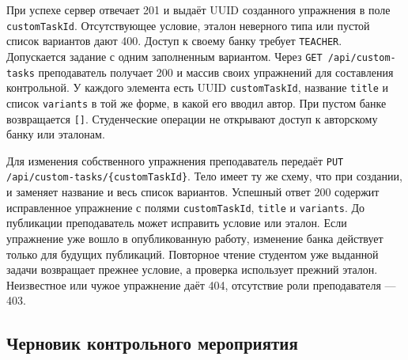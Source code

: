 \documentclass[12pt,a4paper]{article}
\begin{document}
При успехе сервер отвечает 201 и выдаёт UUID созданного упражнения в поле \texttt{custom\allowbreak{}Task\allowbreak{}Id}. Отсутствующее условие, эталон неверного типа или пустой список вариантов дают 400. Доступ к своему банку требует \texttt{TEACHER}. Допускается задание с одним заполненным вариантом. Через \texttt{GET /\allowbreak{}api/\allowbreak{}custom-\allowbreak{}tasks} преподаватель получает 200 и массив своих упражнений для составления контрольной. У каждого элемента есть UUID \texttt{custom\allowbreak{}Task\allowbreak{}Id}, название \texttt{title} и список \texttt{variants} в той же форме, в какой его вводил автор. При пустом банке возвращается \texttt{{[}{]}}. Студенческие операции не открывают доступ к авторскому банку или эталонам.

Для изменения собственного упражнения преподаватель передаёт \texttt{PUT /\allowbreak{}api/\allowbreak{}custom-\allowbreak{}tasks/\allowbreak{}\{custom\allowbreak{}Task\allowbreak{}Id\}}. Тело имеет ту же схему, что при создании, и заменяет название и весь список вариантов. Успешный ответ 200 содержит исправленное упражнение с полями \texttt{custom\allowbreak{}Task\allowbreak{}Id}, \texttt{title} и \texttt{variants}. До публикации преподаватель может исправить условие или эталон. Если упражнение уже вошло в опубликованную работу, изменение банка действует только для будущих публикаций. Повторное чтение студентом уже выданной задачи возвращает прежнее условие, а проверка использует прежний эталон. Неизвестное или чужое упражнение даёт 404, отсутствие роли преподавателя --- 403.

\subsection{Черновик контрольного мероприятия}\label{ux447ux435ux440ux43dux43eux432ux438ux43a-ux43aux43eux43dux442ux440ux43eux43bux44cux43dux43eux433ux43e-ux43cux435ux440ux43eux43fux440ux438ux44fux442ux438ux44f}

\hypertarget{черновик-контрольного-мероприятия}{}
\end{document}
